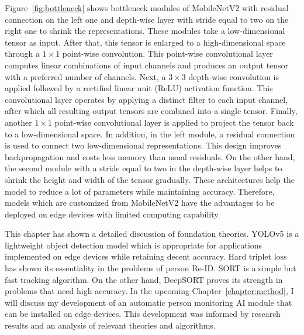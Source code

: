 \documentclass[../main.tex]{subfiles}
\begin{document}
Figure~\ref{fig:bottleneck} shows bottleneck modules of MobileNetV2 with residual connection on the left one and depth-wise layer with stride equal to two on the right one to shrink the representations. These modules take a low-dimensional tensor as input. After that, this tensor is enlarged to a high-dimensional space through a $1\times1$ point-wise convolution. This point-wise convolutional layer computes linear combinations of input channels and produces an output tensor with a preferred number of channels. Next, a $3\times3$ depth-wise convolution is applied followed by a rectified linear unit (ReLU) activation function. This convolutional layer operates by applying a distinct filter to each input channel, after which all resulting output tensors are combined into a single tensor. Finally, another $1\times1$ point-wise convolutional layer is applied to project the tensor back to a low-dimensional space. In addition, in the left module, a residual connection is used to connect two low-dimensional representations. This design improves backpropagation and costs less memory than usual residuals. On the other hand, the second module with a stride equal to two in the depth-wise layer helps to shrink the height and width of the tensor gradually. These architectures help the model to reduce a lot of parameters while maintaining accuracy. Therefore, models which are customized from MobileNetV2 have the advantages to be deployed on edge devices with limited computing capability.

This chapter has shown a detailed discussion of foundation theories. YOLOv5 is a lightweight object detection model which is appropriate for applications implemented on edge devices while retaining decent accuracy. Hard triplet loss has shown its essentiality in the problems of person Re-ID. SORT is a simple but fast tracking algorithm. On the other hand, DeepSORT proves its strength in problems that need high accuracy. In the upcoming Chapter~\ref{chapter:method}, I will discuss my development of an automatic person monitoring AI module that can be installed on edge devices. This development was informed by research results and an analysis of relevant theories and algorithms.
\end{document}
